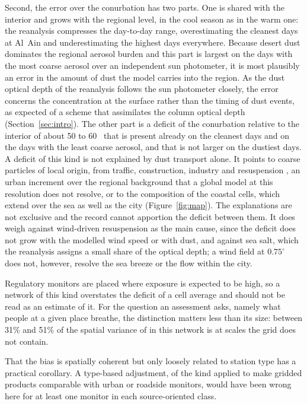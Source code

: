 Second, the error over the conurbation has two parts. One is shared with the interior and grows
with the regional level, in the cool season as in the warm one: the reanalysis compresses the
day-to-day range, overestimating the cleanest days at Al~Ain and underestimating the highest days
everywhere. Because desert dust dominates the regional aerosol burden
\citep{gandham2020,shahid2026} and this part is largest on the days with the most coarse aerosol
over an independent sun photometer, it is most plausibly an error in the amount of dust the model
carries into the region. As the dust optical depth of the reanalysis follows the sun
photometer closely, the error concerns the concentration at the surface rather than the timing of
dust events, as expected of a scheme that assimilates the column optical depth
(Section~\ref{sec:intro}).
The other part is a deficit of the conurbation relative to the interior of about 50 to 60~\ugm{} that is
present already on the cleanest days and on the days with the least coarse aerosol, and that is
not larger on the dustiest days. A deficit of this
kind is not explained by dust transport alone. It points to coarse particles of local origin, from traffic, construction, industry and resuspension \citep{thorpe2008,amato2009}, an urban
increment over the regional background \citep{lenschow2001} that a global model at this
resolution does not resolve, or to the composition of
the coastal cells, which extend over the sea as well as the city (Figure~\ref{fig:map}). The
explanations are not exclusive and the record cannot apportion the deficit between them. It does
weigh against wind-driven resuspension as the main cause, since the deficit does not grow with
the modelled wind speed or with dust, and against sea salt, which the reanalysis assigns a small
share of the optical depth; a wind field at $0.75^{\circ}$ does not, however, resolve the sea
breeze or the flow within the city.

Regulatory monitors are placed where exposure is expected to be high, so a network of this kind
overstates the deficit of a cell average and should not be read as an estimate of it. For the
question an assessment asks, namely what people at a given place breathe, the distinction matters
less than its size: between 31\% and 51\% of the spatial variance of \pmten{} in this
network is at scales the grid does not contain.

That the bias is spatially coherent but only loosely related to station type has a practical
corollary. A type-based adjustment, of the kind applied to make gridded products comparable with
urban or roadside monitors, would have been wrong here for at least one monitor in each
source-oriented class.

